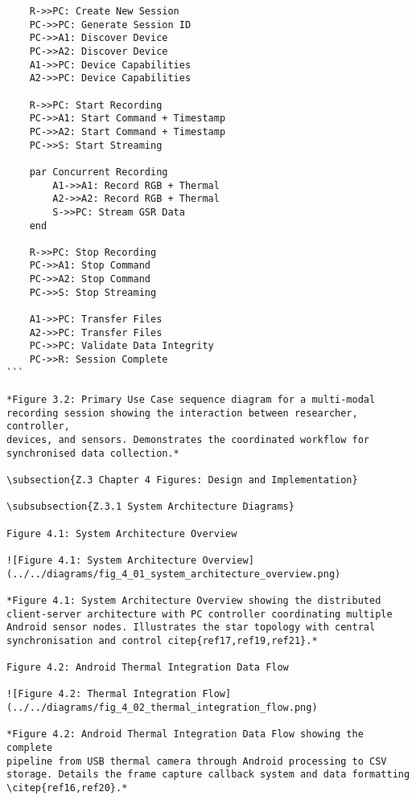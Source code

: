 \begin{verbatim}
    R->>PC: Create New Session
    PC->>PC: Generate Session ID
    PC->>A1: Discover Device
    PC->>A2: Discover Device
    A1->>PC: Device Capabilities
    A2->>PC: Device Capabilities

    R->>PC: Start Recording
    PC->>A1: Start Command + Timestamp
    PC->>A2: Start Command + Timestamp
    PC->>S: Start Streaming

    par Concurrent Recording
        A1->>A1: Record RGB + Thermal
        A2->>A2: Record RGB + Thermal
        S->>PC: Stream GSR Data
    end

    R->>PC: Stop Recording
    PC->>A1: Stop Command
    PC->>A2: Stop Command
    PC->>S: Stop Streaming

    A1->>PC: Transfer Files
    A2->>PC: Transfer Files
    PC->>PC: Validate Data Integrity
    PC->>R: Session Complete
```

*Figure 3.2: Primary Use Case sequence diagram for a multi-modal
recording session showing the interaction between researcher, controller,
devices, and sensors. Demonstrates the coordinated workflow for
synchronised data collection.*

\subsection{Z.3 Chapter 4 Figures: Design and Implementation}

\subsubsection{Z.3.1 System Architecture Diagrams}

Figure 4.1: System Architecture Overview

![Figure 4.1: System Architecture Overview](../../diagrams/fig_4_01_system_architecture_overview.png)

*Figure 4.1: System Architecture Overview showing the distributed
client-server architecture with PC controller coordinating multiple
Android sensor nodes. Illustrates the star topology with central
synchronisation and control citep{ref17,ref19,ref21}.*

Figure 4.2: Android Thermal Integration Data Flow

![Figure 4.2: Thermal Integration Flow](../../diagrams/fig_4_02_thermal_integration_flow.png)

*Figure 4.2: Android Thermal Integration Data Flow showing the complete
pipeline from USB thermal camera through Android processing to CSV
storage. Details the frame capture callback system and data formatting
\citep{ref16,ref20}.*


\end{verbatim}
